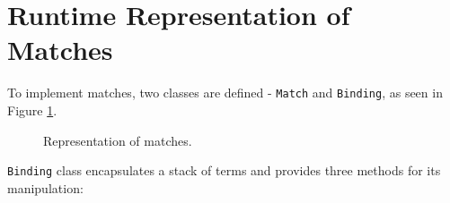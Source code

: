 \section{Runtime Representation of Matches}

To implement matches, two classes are defined - \texttt{Match} and \texttt{Binding}, as seen in Figure \ref{class-diagram-match-binding}.

\begin{figure}[H]
	\centering
	\caption{Representation of matches.}
\label{class-diagram-match-binding}
\end{figure}

\texttt{Binding} class encapsulates a stack of terms and provides three methods for its manipulation:

